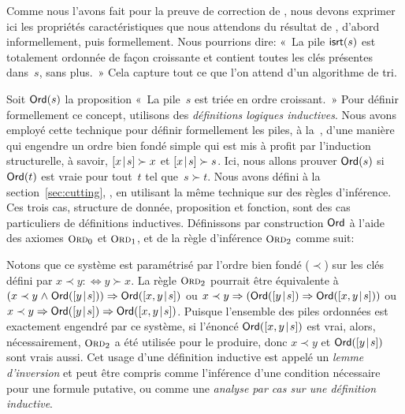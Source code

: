 Comme nous l'avons fait pour la preuve de correction de 
, nous devons exprimer ici les propriétés
caractéristiques que nous attendons du résultat de ,
d'abord informellement, puis formellement. Nous pourrions dire: «~La
pile \(\textsf{isrt}(s)\) est totalement
ordonnée de façon croissante et contient toutes les clés présentes
dans~\(s\), sans plus.~» Cela capture tout ce que l'on attend d'un
algorithme de tri.

Soit \(\textsf{Ord}({s})\) la proposition «~La
pile~\(s\) est triée en ordre croissant.~» Pour définir formellement ce
concept, utilisons des \emph{définitions logiques inductives}.
 Nous avons employé cette
technique pour définir formellement les piles, à
la~, d'une manière qui engendre un ordre bien
fondé simple qui est mis à profit par l'induction structurelle, à
savoir, \([{x}\!\mid\!{s}] \succ x\) et \([{x}\!\mid\!{s}] \succ s\). Ici, nous
allons prouver \(\textsf{Ord}({s})\) si \(\textsf{Ord}({t})\) est vraie pour
tout~\(t\) tel que~\(s \succ t\). Nous avons défini  à la
section~\ref{sec:cutting}, , en utilisant la
même technique sur des règles d'inférence. Ces trois cas, structure de
donnée, proposition et fonction, sont des cas particuliers de
définitions inductives. Définissons par construction
\(\textsf{Ord}\) à l'aide des axiomes \(\TirName{Ord}_0\) et
\(\TirName{Ord}_1\), et de la règle d'inférence \(\TirName{Ord}_2\)
comme suit:\label{def:Ord}
Notons que ce système est paramétrisé par l'ordre bien fondé
(\(\prec\)) sur les clés défini par \(x \prec y :\Leftrightarrow y
\succ x\). La règle \(\TirName{Ord}_2\) pourrait être équivalente à
\((x \prec y \mathrel{\wedge} \textsf{Ord}({[{y}\!\mid\!{s}]})) \Rightarrow
\textsf{Ord}({[{x,y}\!\mid\!{s}]})\) ou \(x \prec y \Rightarrow
(\textsf{Ord}({[{y}\!\mid\!{s}]}) \Rightarrow \textsf{Ord}({[{x,y}\!\mid\!{s}]}))\) ou
\(x \prec y \Rightarrow \textsf{Ord}({[{y}\!\mid\!{s}]}) \Rightarrow
\textsf{Ord}({[{x,y}\!\mid\!{s}]})\). Puisque l'ensemble des piles ordonnées
est exactement engendré par ce système, si l'énoncé
\(\textsf{Ord}({[{x,y}\!\mid\!{s}]})\) est vrai, alors, nécessairement,
\(\TirName{Ord}_2\) a été utilisée pour le produire, donc \(x \prec
y\) et \(\textsf{Ord}({[{y}\!\mid\!{s}]})\) sont vrais aussi. Cet usage d'une
définition inductive est appelé un \emph{lemme
  d'inversion} et peut être compris
comme l'inférence d'une condition nécessaire pour une formule
putative, ou comme une \emph{analyse par cas sur une définition
  inductive}.


